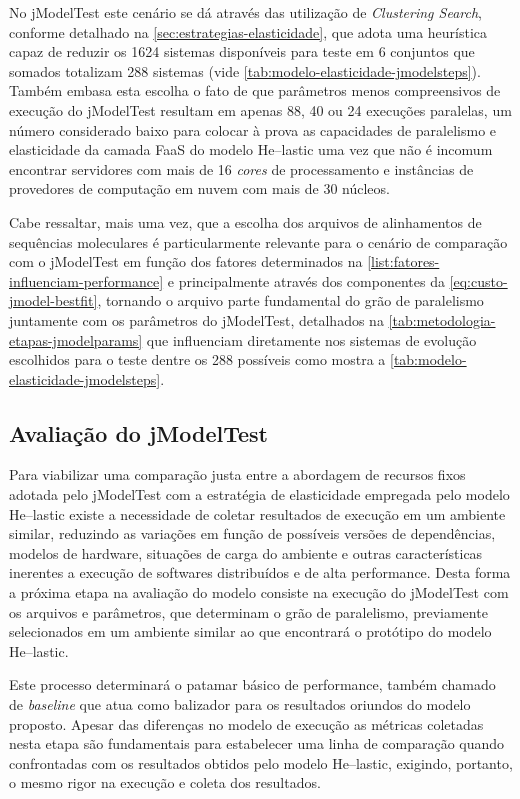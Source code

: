 \documentclass[english,brazilian]{UNISINOSmonografia} %
\begin{document}
No jModelTest este cenário se dá através das utilização de \textit{Clustering Search}, conforme detalhado na \autoref{sec:estrategias-elasticidade}, que adota uma heurística capaz de reduzir os 1624 sistemas disponíveis para teste em 6 conjuntos que somados totalizam 288 sistemas (vide \autoref{tab:modelo-elasticidade-jmodelsteps}).
Também embasa esta escolha o fato de que parâmetros menos compreensivos de execução do jModelTest resultam em apenas 88, 40 ou 24 execuções paralelas, um número considerado baixo para colocar à prova as capacidades de paralelismo e elasticidade da camada FaaS do modelo \textsf{He}--lastic uma vez que não é incomum encontrar servidores com mais de 16 \textit{cores} de processamento e instâncias de provedores de computação em nuvem com mais de 30 núcleos.


Cabe ressaltar, mais uma vez, que a escolha dos arquivos de alinhamentos de sequências moleculares é particularmente relevante para o cenário de comparação com o jModelTest em função dos fatores determinados na \autoref{list:fatores-influenciam-performance} e principalmente através dos componentes da \autoref{eq:custo-jmodel-bestfit}, tornando o arquivo parte fundamental do grão de paralelismo juntamente com os parâmetros do jModelTest, detalhados na \autoref{tab:metodologia-etapas-jmodelparams} que influenciam diretamente nos sistemas de evolução escolhidos para o teste dentre os 288 possíveis como mostra a \autoref{tab:modelo-elasticidade-jmodelsteps}.



\subsection{Avaliação do jModelTest}


Para viabilizar uma comparação justa entre a abordagem de recursos fixos adotada pelo jModelTest com a estratégia de elasticidade empregada pelo modelo \textsf{He}--lastic existe a necessidade de coletar resultados de execução em um ambiente similar, reduzindo as variações em função de possíveis versões de dependências, modelos de hardware, situações de carga do ambiente e outras características inerentes a execução de softwares distribuídos e de alta performance.
Desta forma a próxima etapa na avaliação do modelo consiste na execução do jModelTest com os arquivos e parâmetros, que determinam o grão de paralelismo, previamente selecionados em um ambiente similar ao que encontrará o protótipo do modelo \textsf{He}--lastic.


Este processo determinará o patamar básico de performance, também chamado de \textit{baseline} que atua como balizador para os resultados oriundos do modelo proposto.
Apesar das diferenças no modelo de execução as métricas coletadas nesta etapa são fundamentais para estabelecer uma linha de comparação quando confrontadas com os resultados obtidos pelo modelo \textsf{He}--lastic, exigindo, portanto, o mesmo rigor na execução e coleta dos resultados.
\end{document}
